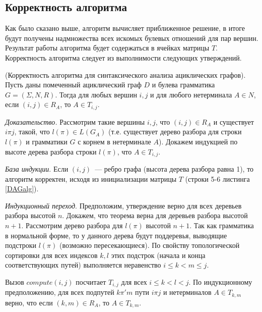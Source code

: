\subsection {Корректность алгоритма}
Как было сказано выше, алгоритм вычисляет приближенное решение, в итоге будут получены надмножества всех искомых булевых отношений для пар вершин. Результат работы алгоритма будет содержаться в ячейках матрицы $T$.
Корректность алгоритма следует из выполнимости следующих утверждений.
\begin{theoremrus} (Корректность алгоритма для синтаксического
анализа ациклических графов). Пусть даны помеченный
ациклический граф $D$ и булева грамматика $G = (\Sigma, N, R)$.
Тогда для любых вершин $i, j$ и для любого нетерминала $A \in N$, если
$(i, j) \in R_A$, то $A \in T_{i,j}$.
\end{theoremrus}
\textit{Доказательство.} Рассмотрим такие вершины $i,j$, что $(i, j) \in R_A$ и существует $i \pi j$, такой, что $l(\pi) \in L(G_A)$ (т.е. существует дерево разбора для строки $l(\pi)$ и грамматики $G$ с корнем в нетерминале $A$). Докажем индукцией по высоте дерева разбора строки $l(\pi)$, что $A \in T_{i,j}$.

\textit{База индукции}. Если $(i, j)$~--- ребро графа (высота дерева разбора равна 1), то алгоритм корректен, исходя из инициализации
матрицы $T$ (строки 5-6 листинга \ref{DAGalg}).

\textit{Индукционный переход}. Предположим, утверждение верно для
всех деревьев разбора высотой $n$. Докажем, что теорема верна для
деревьев разбора высотой $n+1$. Рассмотрим дерево разбора для $l(\pi)$ высотой $n+1$. Так как
грамматика в нормальной форме, то у данного дерева будут
поддеревья, выводящие подстроки $l(\pi)$ (возможно
пересекающиеся). По свойству топологической сортировки для
всех индексов $k,l$ этих подстрок (начала и конца соответствующих
путей) выполняется неравенство $i \le k < m \le j$.

Вызов $compute(i, j)$ посчитает $T_{i,j}$ для всех $i \le k < l < j$. По индукционному предположению, для всех подпутей
$k \pi' m$ пути $i \pi j$ и нетерминалов $A \in T_{k,m}$ верно, что если $(k, m) \in R_A$, то $A \in T_{k,m}$.

